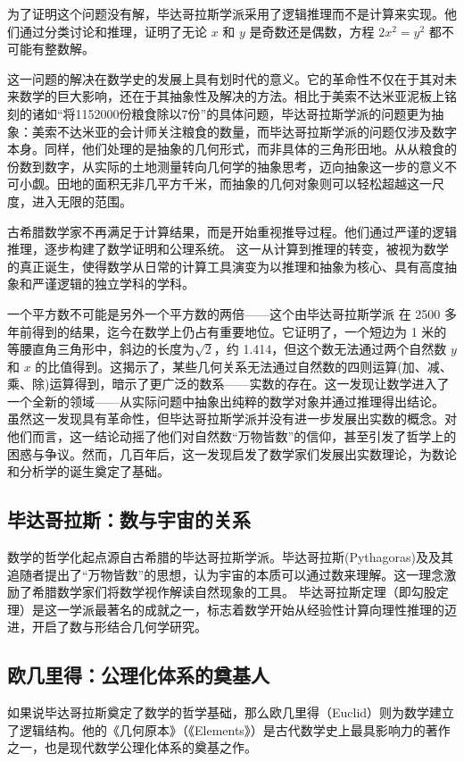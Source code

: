 为了证明这个问题没有解，毕达哥拉斯学派采用了逻辑推理而不是计算来实现。他们通过分类讨论和推理，证明了无论 $x$ 和 $y$ 是奇数还是偶数，方程 $2x^2 = y^2$ 都不可能有整数解。

这一问题的解决在数学史的发展上具有划时代的意义。它的革命性不仅在于其对未来数学的巨大影响，还在于其抽象性及解决的方法。相比于美索不达米亚泥板上铭刻的诸如“将1152000份粮食除以7份”的具体问题，毕达哥拉斯学派的问题更为抽象：美索不达米亚的会计师关注粮食的数量，而毕达哥拉斯学派的问题仅涉及数字本身。同样，他们处理的是抽象的几何形式，而非具体的三角形田地。从从粮食的份数到数字，从实际的土地测量转向几何学的抽象思考，迈向抽象这一步的意义不可小觑。田地的面积无非几平方千米，而抽象的几何对象则可以轻松超越这一尺度，进入无限的范围。

古希腊数学家不再满足于计算结果，而是开始重视推导过程。他们通过严谨的逻辑推理，逐步构建了数学证明和公理系统。
这一从计算到推理的转变，被视为数学的真正诞生，使得数学从日常的计算工具演变为以推理和抽象为核心、具有高度抽象和严谨逻辑的独立学科的学科。

一个平方数不可能是另外一个平方数的两倍——这个由毕达哥拉斯学派 在 2500 多年前得到的结果，迄今在数学上仍占有重要地位。它证明了，一个短边为 1 米的等腰直角三角形中，斜边的长度为$\sqrt{2}$，约 1.414，但这个数无法通过两个自然数 $y$ 和 $x$ 的比值得到。这揭示了，某些几何关系无法通过自然数的四则运算(加、减、乘、除)运算得到，暗示了更广泛的数系——实数的存在。这一发现让数学进入了一个全新的领域——从实际问题中抽象出纯粹的数学对象并通过推理得出结论。
虽然这一发现具有革命性，但毕达哥拉斯学派并没有进一步发展出实数的概念。对他们而言，这一结论动摇了他们对自然数“万物皆数”的信仰，甚至引发了哲学上的困惑与争议。然而，几百年后，这一发现启发了数学家们发展出实数理论，为数论和分析学的诞生奠定了基础。

\subsection{毕达哥拉斯：数与宇宙的关系}
数学的哲学化起点源自古希腊的毕达哥拉斯学派。毕达哥拉斯(Pythagoras)及及其追随者提出了“万物皆数”的思想，认为宇宙的本质可以通过数来理解。这一理念激励了希腊数学家们将数学视作解读自然现象的工具。
毕达哥拉斯定理（即勾股定理）是这一学派最著名的成就之一，标志着数学开始从经验性计算向理性推理的迈进，开启了数与形结合几何学研究。

\subsection{欧几里得：公理化体系的奠基人}
如果说毕达哥拉斯奠定了数学的哲学基础，那么欧几里得（Euclid）则为数学建立了逻辑结构。他的《几何原本》（《Elements》）是古代数学史上最具影响力的著作之一，也是现代数学公理化体系的奠基之作。

